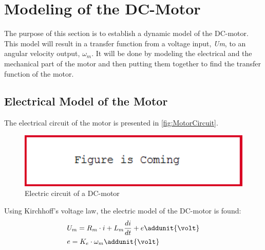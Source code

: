 \section{Modeling of the DC-Motor}

The purpose of this section is to establish a dynamic model of the DC-motor. This model will result in a transfer function from a voltage input, \textit{Um}, to an angular velocity output, \textit{$\omega_m$}. It will be done by modeling the electrical and the mechanical part of the motor and then putting them together to find the transfer function of the motor.

\subsection*{Electrical Model of the Motor}
The electrical circuit of the motor is presented in \autoref{fig:MotorCircuit}.

\begin{figure}[htbp]
	\centering
 	\includegraphics[width=1\textwidth]{figures/FigureIsComing.PNG} 
 	\caption{Electric circuit of a DC-motor}
 	\label{fig:MotorCircuit}
\end{figure}

Using Kirchhoff's voltage law, the electric model of the DC-motor is found:
\begin{subequations} \label{eq:tech_ToA}
	\begin{flalign}
		&U_m = R_m \cdot i + L_m \frac{di}{dt} + e \addunit{\volt} \\
		&e = K_e \cdot \omega_m \addunit{\volt}
	\end{flalign}
\end{subequations}

\startexplain
\stopexplain

